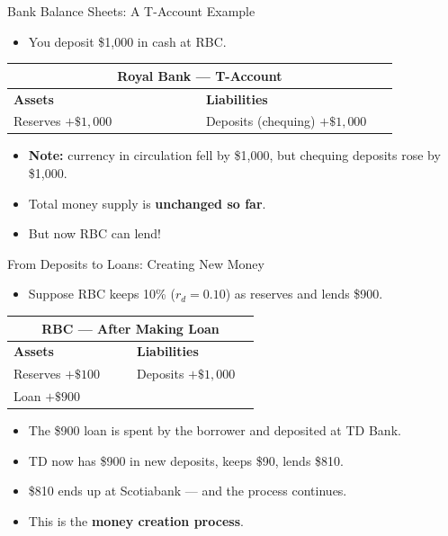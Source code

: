 \documentclass[aspectratio=169]{beamer}
\begin{document}
\begin{frame}{Bank Balance Sheets: A T-Account Example}
\transfade
\begin{itemize}[<+->]
  \item You deposit \alert{\$1{,}000} in cash at RBC.
\end{itemize}
\vspace{0.3em}
\begin{center}
\begin{tabular}{p{0.45\linewidth} p{0.45\linewidth}}
\toprule
\multicolumn{2}{c}{\textbf{Royal Bank --- T-Account}} \\
\midrule
\textbf{Assets} & \textbf{Liabilities} \\
\midrule
Reserves $+\$1{,}000$ & Deposits (chequing) $+\$1{,}000$ \\
\bottomrule
\end{tabular}
\end{center}
\vspace{0.5em}
\begin{itemize}[<+->]
  \item \textbf{Note:} currency in circulation fell by \$1{,}000, but chequing deposits rose by \$1{,}000.
  \item Total money supply is \textbf{unchanged so far}.
  \item But now RBC can lend!
\end{itemize}
\end{frame}

\begin{frame}{From Deposits to Loans: Creating New Money}
\transfade
\begin{itemize}[<+->]
  \item Suppose RBC keeps 10\% ($r_d = 0.10$) as reserves and lends \alert{\$900}.
\end{itemize}
\begin{center}
\small
\begin{tabular}{p{0.45\linewidth} p{0.45\linewidth}}
\toprule
\multicolumn{2}{c}{\textbf{RBC --- After Making Loan}} \\
\midrule
\textbf{Assets} & \textbf{Liabilities} \\
\midrule
Reserves $+\$100$ & Deposits $+\$1{,}000$ \\
Loan $+\$900$ & \\
\bottomrule
\end{tabular}
\end{center}
\vspace{0.4em}
\begin{itemize}[<+->]
  \item The \$900 loan is spent by the borrower and deposited at TD Bank.
  \item TD now has \$900 in new deposits, keeps \$90, lends \$810.
  \item \$810 ends up at Scotiabank --- and the process continues.
  \item This is the \textbf{money creation process}.
\end{itemize}
\end{frame}
\end{document}
